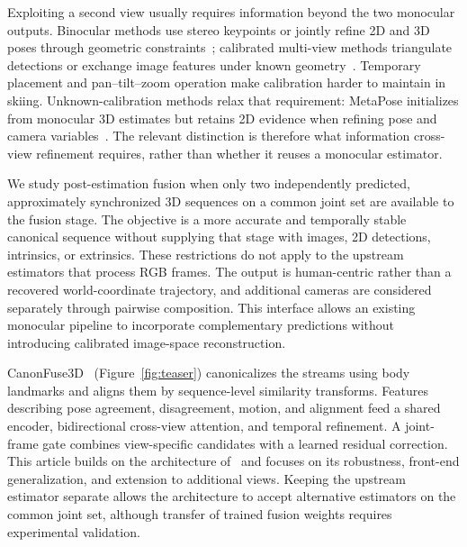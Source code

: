 \documentclass[preprint,12pt]{elsarticle}
\begin{document}
Exploiting a second view usually requires information beyond the two monocular outputs. Binocular methods use stereo keypoints or jointly refine 2D and 3D poses through geometric constraints~\cite{wan2025rsb,wan2024dualdiffusion}; calibrated multi-view methods triangulate detections or exchange image features under known geometry~\cite{iskakov2019learnable,he2020epipolar,liao2024multiple,zhang2021adafuse}. Temporary placement and pan--tilt--zoom operation make calibration harder to maintain in skiing. Unknown-calibration methods relax that requirement: MetaPose initializes from monocular 3D estimates but retains 2D evidence when refining pose and camera variables~\cite{usman2022metapose}. The relevant distinction is therefore what information cross-view refinement requires, rather than whether it reuses a monocular estimator.

We study post-estimation fusion when only two independently predicted, approximately synchronized 3D sequences on a common joint set are available to the fusion stage. The objective is a more accurate and temporally stable canonical sequence without supplying that stage with images, 2D detections, intrinsics, or extrinsics. These restrictions do not apply to the upstream estimators that process RGB frames. The output is human-centric rather than a recovered world-coordinate trajectory, and additional cameras are considered separately through pairwise composition. This interface allows an existing monocular pipeline to incorporate complementary predictions without introducing calibrated image-space reconstruction.

CanonFuse3D~\cite{chen2026canonfuse3dconference} (Figure~\ref{fig:teaser}) canonicalizes the streams using body landmarks and aligns them by sequence-level similarity transforms. Features describing pose agreement, disagreement, motion, and alignment feed a shared encoder, bidirectional cross-view attention, and temporal refinement. A joint-frame gate combines view-specific candidates with a learned residual correction. This article builds on the architecture of~\cite{chen2026canonfuse3dconference} and focuses on its robustness, front-end generalization, and extension to additional views. Keeping the upstream estimator separate allows the architecture to accept alternative estimators on the common joint set, although transfer of trained fusion weights requires experimental validation.
\end{document}
